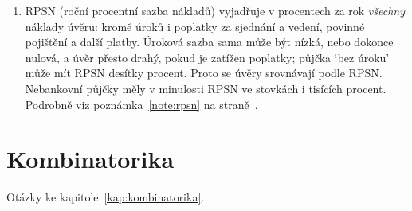 \begin{enumerate}[label=\textbf{\arabic*.}, leftmargin=*, itemsep=0.8em]
  \item {}
  RPSN (roční procentní sazba nákladů) vyjadřuje v procentech za rok \emph{všechny} náklady úvěru: kromě úroků i poplatky za sjednání a vedení, povinné pojištění a další platby. Úroková sazba sama může být nízká, nebo dokonce nulová, a úvěr přesto drahý, pokud je zatížen poplatky; půjčka `bez úroku' může mít RPSN desítky procent. Proto se úvěry srovnávají podle RPSN. Nebankovní půjčky měly v minulosti RPSN ve stovkách i tisících procent. Podrobně viz poznámka~\ref{note:rpsn} na straně~\pageref{note:rpsn}.
\end{enumerate}

\section{Kombinatorika}

Otázky ke kapitole~\ref{kap:kombinatorika}.

